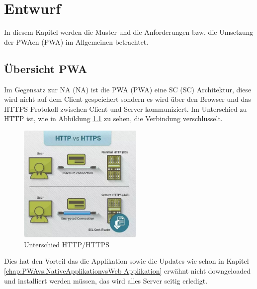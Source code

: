 \chapter{Entwurf}
\thispagestyle{standard}
\pagestyle{standard}
\renewcommand{\footrulewidth}{0.4pt}

In diesem Kapitel werden die Muster und die Anforderungen bzw. die Umsetzung der \acl{PWA}en (\acs{PWA}) im Allgemeinen betrachtet.


\section{Übersicht PWA}\label{sub:Übersicht PWA}
Im Gegensatz zur \acl{NA} (\acs{NA}) ist die \acl{PWA} (\acs{PWA}) eine \acl{SC} (\acs{SC}) Architektur, diese wird nicht auf dem Client gespeichert sondern es wird über den Browser und das HTTPS-Protokoll zwischen Client und Server kommuniziert. Im Unterschied zu HTTP ist, wie in Abbildung \ref{fig:HTTP_HTTPS} zu sehen, die Verbindung verschlüsselt.

\begin{figure}[h]
	\centering
	\includegraphics[width=6cm]{BilderAllgemein/HTTP_HTTPS}\medskip
	\caption{Unterschied HTTP/HTTPS \cite{HTTPS}}
	\label{fig:HTTP_HTTPS}
\end{figure}

Dies hat den Vorteil das die Applikation sowie die Updates wie schon in Kapitel \ref{chap:PWAvs.NativeApplikationvsWeb Applikation} erwähnt nicht downgeloaded und installiert werden müssen, das wird alles Server seitig erledigt. 

\newpage




